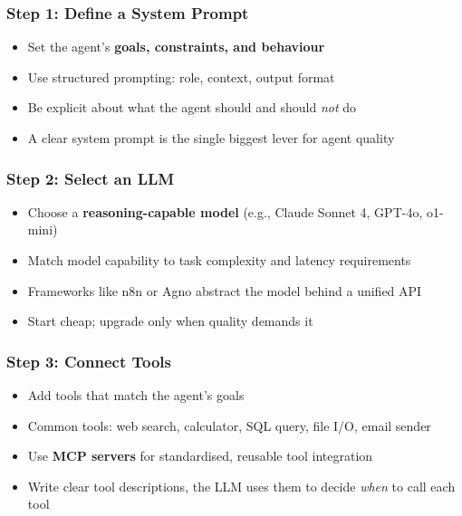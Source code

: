 \begin{frame}[fragile]\frametitle{Step 1: Define a System Prompt}
      \begin{itemize}
        \item Set the agent's \textbf{goals, constraints, and behaviour}
        \item Use structured prompting: role, context, output format
        \item Be explicit about what the agent should and should \emph{not} do
        \item A clear system prompt is the single biggest lever for agent quality
      \end{itemize}
\end{frame}

\begin{frame}[fragile]\frametitle{Step 2: Select an LLM}
      \begin{itemize}
        \item Choose a \textbf{reasoning-capable model} (e.g., Claude Sonnet 4, GPT-4o, o1-mini)
        \item Match model capability to task complexity and latency requirements
        \item Frameworks like n8n or Agno abstract the model behind a unified API
        \item Start cheap; upgrade only when quality demands it
      \end{itemize}
\end{frame}

\begin{frame}[fragile]\frametitle{Step 3: Connect Tools}
      \begin{itemize}
        \item Add tools that match the agent's goals
        \item Common tools: web search, calculator, SQL query, file I/O, email sender
        \item Use \textbf{MCP servers} for standardised, reusable tool integration
        \item Write clear tool descriptions, the LLM uses them to decide \emph{when} to call each tool
      \end{itemize}
\end{frame}

